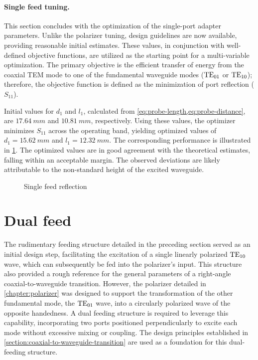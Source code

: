 \documentclass[11pt,a4paper,twoside,openany]{report}
\begin{document}
\paragraph{Single feed tuning.} This section concludes with the optimization of the single-port adapter parameters. Unlike the polarizer tuning, design guidelines are now available, providing reasonable initial estimates. These values, in conjunction with well-defined objective functions, are utilized as the starting point for a multi-variable optimization. The primary objective is the efficient transfer of energy from the coaxial TEM mode to one of the fundamental waveguide modes ($\text{TE}_{01}$ or $\text{TE}_{10}$); therefore, the objective function is defined as the minimization of port reflection ($S_{11}$).

Initial values for $d_1$ and $l_1$, calculated from \cref{eq:probe-length,eq:probe-distance}, are $\qty{17.64}{mm}$ and $\qty{10.81}{mm}$, respectively. Using these values, the optimizer minimizes $S_{11}$ across the operating band, yielding optimized values of $d_1 = \qty{15.62}{mm}$ and $l_1 = \qty{12.32}{mm}$. The corresponding performance is illustrated in \cref{fig:single-feed-reflection}. The optimized values are in good agreement with the theoretical estimates, falling within an acceptable margin. The observed deviations are likely attributable to the non-standard height of the excited waveguide.

\begin{figure}[!ht]
    \centering
    
    \caption{\label{fig:single-feed-reflection}Single feed reflection}
\end{figure}

\section{Dual feed}
\label{section:dual-feed}
The rudimentary feeding structure detailed in the preceding section served as an initial design step, facilitating the excitation of a single linearly polarized $\text{TE}_{10}$ wave, which can subsequently be fed into the polarizer's input. This structure also provided a rough reference for the general parameters of a right-angle coaxial-to-waveguide transition. However, the polarizer detailed in \cref{chapter:polarizer} was designed to support the transformation of the other fundamental mode, the $\text{TE}_{01}$ wave, into a circularly polarized wave of the opposite handedness. A dual feeding structure is required to leverage this capability, incorporating two ports positioned perpendicularly to excite each mode without excessive mixing or coupling. The design principles established in \cref{section:coaxial-to-waveguide-transition} are used as a foundation for this dual-feeding structure.
\end{document}

